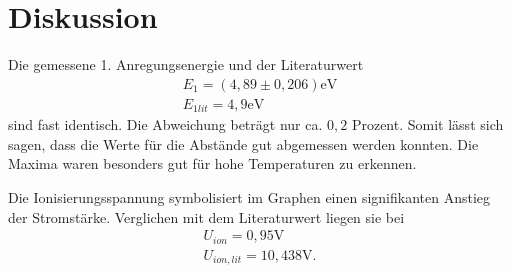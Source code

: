 \section{Diskussion}
\label{sec:Diskussion}

Die gemessene 1. Anregungsenergie und der Literaturwert\cite{kent3}
\begin{align*}
E_1 = (4,89 \pm 0,206) \si{\eV} \\
E_{1lit} = 4,9 \si{\eV}
\end{align*}
sind fast identisch. Die Abweichung beträgt nur ca. $0,2$ Prozent.
Somit lässt sich sagen, dass die Werte für die Abstände gut abgemessen werden konnten. 
Die Maxima waren besonders gut für hohe Temperaturen zu erkennen.

Die Ionisierungsspannung symbolisiert im Graphen einen signifikanten Anstieg der Stromstärke.
Verglichen mit dem Literaturwert\cite{kent2} liegen sie bei
\begin{align*}
U_{ion} = 0,95\si{\V} \\
U_{ion,lit} = 10,438\si{\V}.
\end{align*}
